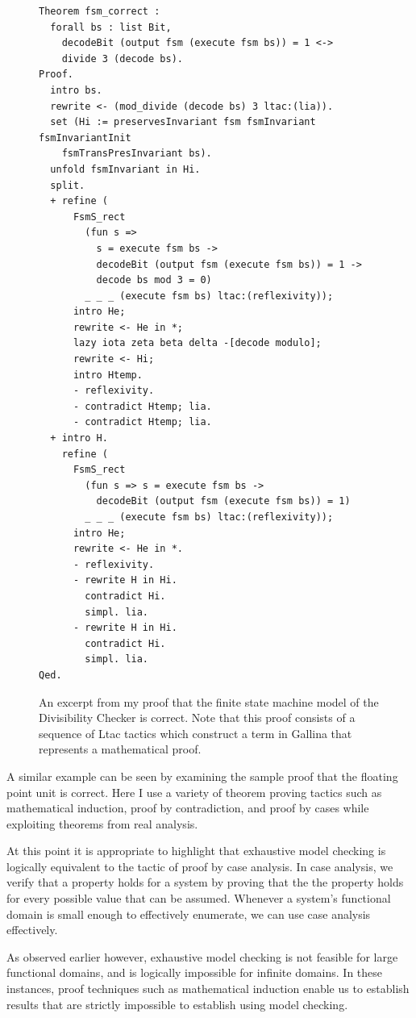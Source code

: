 \documentclass[10pt,a4paper]{article}
\begin{document}
\begin{figure}
\centering
\begin{verbatim}
Theorem fsm_correct :
  forall bs : list Bit,
    decodeBit (output fsm (execute fsm bs)) = 1 <->
    divide 3 (decode bs).
Proof.
  intro bs.
  rewrite <- (mod_divide (decode bs) 3 ltac:(lia)).
  set (Hi := preservesInvariant fsm fsmInvariant fsmInvariantInit
    fsmTransPresInvariant bs).
  unfold fsmInvariant in Hi.
  split.
  + refine (
      FsmS_rect
        (fun s =>
          s = execute fsm bs ->
          decodeBit (output fsm (execute fsm bs)) = 1 ->
          decode bs mod 3 = 0)
        _ _ _ (execute fsm bs) ltac:(reflexivity));
      intro He;
      rewrite <- He in *;
      lazy iota zeta beta delta -[decode modulo];
      rewrite <- Hi;
      intro Htemp.
      - reflexivity.
      - contradict Htemp; lia.
      - contradict Htemp; lia.
  + intro H.
    refine (
      FsmS_rect
        (fun s => s = execute fsm bs ->
          decodeBit (output fsm (execute fsm bs)) = 1)
        _ _ _ (execute fsm bs) ltac:(reflexivity));
      intro He;
      rewrite <- He in *.
      - reflexivity.
      - rewrite H in Hi.
        contradict Hi.
        simpl. lia.
      - rewrite H in Hi.
        contradict Hi.
        simpl. lia.
Qed.
\end{verbatim}
\caption{An excerpt from my proof that the finite state machine model of the Divisibility Checker is correct. Note that this proof consists of a sequence of Ltac tactics which construct a term in Gallina that represents a mathematical proof. }
\label{fsm-proof}
\end{figure}

A similar example can be seen by examining the sample proof that the floating point unit is correct. Here I use a variety of theorem proving tactics such as mathematical induction, proof by contradiction, and proof by cases while exploiting theorems from real analysis. 

At this point it is appropriate to highlight that exhaustive model checking is logically equivalent to the tactic of proof by case analysis. In case analysis, we verify that a property holds for a system by proving that the the property holds for every possible value that can be assumed. Whenever a system’s functional domain is small enough to effectively enumerate, we can use case analysis effectively.

As observed earlier however, exhaustive model checking is not feasible for large functional domains, and is logically impossible for infinite domains. In these instances, proof techniques such as mathematical induction enable us to establish results that are strictly impossible to establish using model checking.
\end{document}
